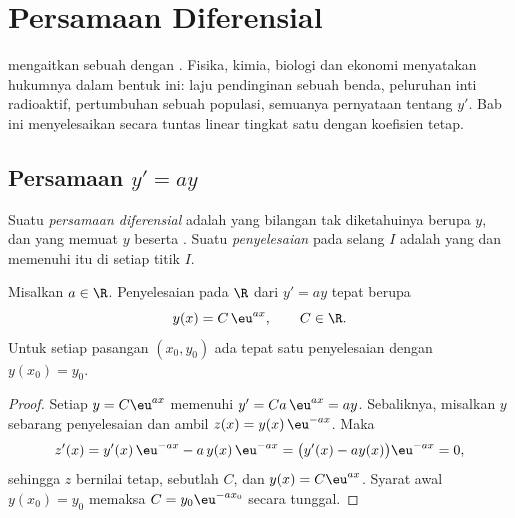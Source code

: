 \chapter{Persamaan Diferensial}\label{ch:g12:diffeq}

 mengaitkan sebuah  dengan . Fisika,
kimia, biologi dan ekonomi menyatakan hukumnya dalam bentuk ini: laju
pendinginan sebuah benda, peluruhan inti radioaktif, pertumbuhan sebuah
populasi, semuanya pernyataan tentang $y'$. Bab ini menyelesaikan secara
tuntas  linear tingkat satu dengan koefisien tetap.

\section{Persamaan \texorpdfstring{$y' = ay$}{y' = ay}}

\begin{definition}\label{def:g12:diffeq:ode}
Suatu \emph{persamaan diferensial} adalah 
yang bilangan tak diketahuinya berupa  $y$, dan yang memuat $y$ beserta
. Suatu \emph{penyelesaian} pada selang $I$ adalah  yang  dan memenuhi  itu di setiap titik $I$.
\end{definition}

\begin{theorem}[Penyelesaian $y' = ay$]\label{thm:g12:diffeq:homogeneous}
Misalkan $a \in \R$. Penyelesaian pada $\R$ dari  $y' = ay$ tepat
berupa 
\[
y(x) = C\,\eu^{ax}, \qquad C \in \R .
\]
Untuk setiap pasangan $(x_0, y_0)$ ada tepat satu penyelesaian dengan
$y(x_0) = y_0$.
\end{theorem}

\begin{proof}
Setiap $y = C\eu^{ax}$ memenuhi $y' = Ca\,\eu^{ax} = ay$. Sebaliknya, misalkan
$y$ sebarang penyelesaian dan ambil $z(x) = y(x)\,\eu^{-ax}$. Maka
\[
z'(x) = y'(x)\,\eu^{-ax} - a\,y(x)\,\eu^{-ax}
= \bigl(y'(x) - a y(x)\bigr)\eu^{-ax} = 0,
\]
sehingga $z$ bernilai tetap, sebutlah $C$, dan $y(x) = C\eu^{ax}$. Syarat awal
$y(x_0) = y_0$ memaksa $C = y_0 \eu^{-a x_0}$ secara tunggal.
\end{proof}

